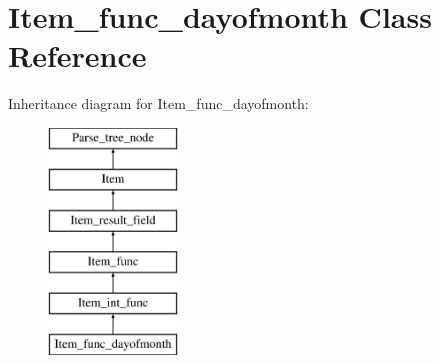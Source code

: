 \hypertarget{classItem__func__dayofmonth}{}\section{Item\+\_\+func\+\_\+dayofmonth Class Reference}
\label{classItem__func__dayofmonth}
Inheritance diagram for Item\+\_\+func\+\_\+dayofmonth\+:\begin{figure}[H]
\begin{center}
\leavevmode
\includegraphics[height=6.000000cm]{classItem__func__dayofmonth}
\end{center}
\end{figure}
